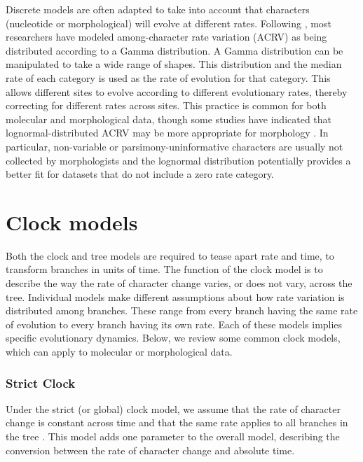 Discrete models are often adapted to take into account that characters (nucleotide or morphological) will evolve at different rates. Following \citet{Yang1994a}, most researchers have modeled among-character rate variation (ACRV) as being distributed according to a Gamma distribution.
A Gamma distribution can be manipulated to take a wide range of shapes.
This distribution 
and the median rate of each category is used as the rate of evolution for that category.
This allows different sites to evolve according to different evolutionary rates, thereby correcting for different rates across sites.
This practice is common for both molecular and morphological data, though some studies have indicated that lognormal-distributed ACRV may be more appropriate for morphology \citep{wagner2011, Harrison2015}.
In particular, non-variable or parsimony-uninformative characters are usually not collected by morphologists and the lognormal distribution potentially provides a better fit for datasets that do not include a zero rate category.

\section{Clock models}
Both the clock and tree models are required to tease apart rate and time,  to transform branches in units of time.
The function of the clock model is to describe the way the rate of character change varies, or does not vary, across the tree.
Individual models make different assumptions about how rate variation is distributed among branches.
These range from  every branch having the same rate of evolution to every branch having its own rate.
Each of these models implies specific evolutionary dynamics.
Below, we review some common clock models, which can apply to molecular or morphological data.

\subsubsection{Strict Clock}
Under the strict (or global) clock model, we assume that the rate of character change is constant across time and that the same rate applies to all branches in the tree \citep{Zuckerkandl1962, Zuckerkandl1965EvolutionaryDivergenceConvergence}.
This model adds one parameter to the overall model, describing the conversion between the rate of character change  and absolute time.

